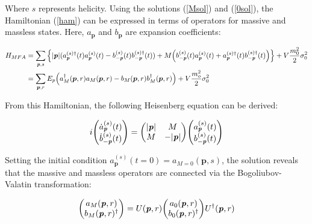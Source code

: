        Where $s$ represents helicity.  
        Using the solutions (\ref{Msol}) and (\ref{0sol}), the Hamiltonian (\ref{ham}) can be expressed in terms of operators for massive and massless states. Here, $a_{\bm{p}}$ and $b_{\bm{p}}$ are expansion coefficients:  
        
        \begin{align}
            \label{hamenzan}
            H_{MFA}&=\sum_{\textbf{\textit{p}},s} \qty{|\textbf{\textit{p}}|(a_{\textbf{\textit{p}}}^{(s)\dag}(t) a_{\textbf{\textit{p}}}^{(s)}(t)-b_{-\textbf{\textit{p}}}^{(s)}(t)
            b_{-\textbf{\textit{p}}}^{(s)\dag}(t))+M\qty(b_{-\textbf{\textit{p}}}^{(s)} (t)a_{\textbf{\textit{p}}}^{(s)}(t)+a_{\textbf{\textit{p}}}^{(s)\dag}(t) b_{-\textbf{\textit{p}}}^{(s)\dag}(t))} +V \frac{m_0^2}{2}\sigma_0^2 \\
            \label{massfinite}
            &=\sum_{\bm{p},r}E_p\qty(a^\dagger_M(\bm{p},r)a_M(\bm{p},r)-b_M(\bm{p},r)b^\dagger_M(\bm{p},r))+V\frac{m_o^2}{2}\sigma_0^2
        \end{align}
        
        From this Hamiltonian, the following Heisenberg equation can be derived:  

        \begin{eqnarray}
            \label{massless_Heisenberg_e.q.}
            i \mqty(\dot{a}_{\textbf{\textit{p}}}^{(s)}(t)\\\dot{b}_{-\textbf{\textit{p}}}^{(s)}(t))=\mqty(|\textbf{\textit{p}}|&M\\M&-|\textbf{\textit{p}}|)\mqty(a_{\textbf{\textit{p}}}^{(s)}(t)\\b_{-\textbf{\textit{p}}}^{(s)}(t))
        \end{eqnarray}
        
        Setting the initial condition $a_{\bm{p}}^{(s)}(t=0) = a_{M=0}(\bm{p},s)$, the solution reveals that the massive and massless operators are connected via the Bogoliubov-Valatin transformation:  
    
        \begin{eqnarray}
            \label{Bogoliubov transformation}
            \mqty(a_{M}(\textbf{\textit{p}},r)\\b_{M}(\textbf{\textit{p}},r)^{\dag})=U(\textbf{\textit{p}},r) \mqty(a_0(\textbf{\textit{p}},r)\\b_0(\textbf{\textit{p}},r)^{\dag})U^{\dag}(\textbf{\textit{p}},r)
        \end{eqnarray}
        
